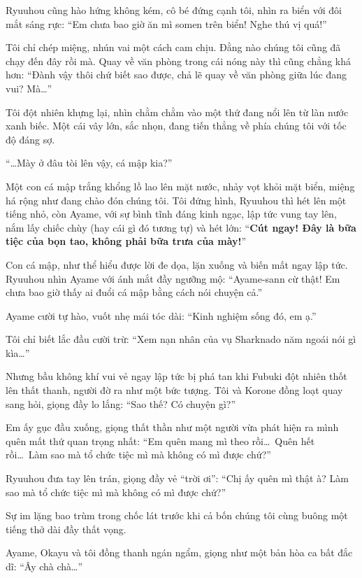 \documentclass[../main.tex]{subfiles}
\begin{document}
Ryuuhou cũng hào hứng không kém, cô bé đứng cạnh tôi, nhìn ra biển với đôi mắt sáng rực: ``Em chưa bao giờ ăn mì somen trên biển! Nghe thú vị quá!''

Tôi chỉ chép miệng, nhún vai một cách cam chịu. Đằng nào chúng tôi cũng đã chạy đến đây rồi mà. Quay về văn phòng trong cái nóng này thì cũng chẳng khá hơn: ``Đành vậy thôi chứ biết sao được, chả lẽ quay về văn phòng giữa lúc đang vui? Mà\dots''

Tôi đột nhiên khựng lại, nhìn chằm chằm vào một thứ đang nổi lên từ làn nước xanh biếc. Một cái vây lớn, sắc nhọn, đang tiến thẳng về phía chúng tôi với tốc độ đáng sợ.

``\dots Mày ở đâu tòi lên vậy, cá mập kia?''

Một con cá mập trắng khổng lồ lao lên mặt nước, nhảy vọt khỏi mặt biển, miệng há rộng như đang chào đón chúng tôi. Tôi đứng hình, Ryuuhou thì hét lên một tiếng nhỏ, còn Ayame, với sự bình tĩnh đáng kinh ngạc, lập tức vung tay lên, nắm lấy chiếc chùy (hay cái gì đó tương tự) và hét lớn: ``\textbf{Cút ngay! Đây là bữa tiệc của bọn tao, không phải bữa trưa của mày!}''

Con cá mập, như thể hiểu được lời đe dọa, lặn xuống và biến mất ngay lập tức. Ryuuhou nhìn Ayame với ánh mắt đầy ngưỡng mộ: ``Ayame-sann cừ thật! Em chưa bao giờ thấy ai đuổi cá mập bằng cách nói chuyện cả.''

Ayame cười tự hào, vuốt nhẹ mái tóc dài: ``Kinh nghiệm sống đó, em ạ.''

Tôi chỉ biết lắc đầu cười trừ: ``Xem nạn nhân của vụ Sharknado năm ngoái nói gì kìa\dots''

Nhưng bầu không khí vui vẻ ngay lập tức bị phá tan khi Fubuki đột nhiên thốt lên thất thanh, người đờ ra như một bức tượng. Tôi và Korone đồng loạt quay sang hỏi, giọng đầy lo lắng: ``Sao thế? Có chuyện gì?''

Em ấy gục đầu xuống, giọng thất thần như một người vừa phát hiện ra mình quên mất thứ quan trọng nhất: ``Em quên mang mì theo rồi\dots\ Quên hết rồi\dots\ Làm sao mà tổ chức tiệc mì mà không có mì được chứ?''

Ryuuhou đưa tay lên trán, giọng đầy vẻ ``trời ơi'': ``Chị ấy quên mì thật à? Làm sao mà tổ chức tiệc mì mà không có mì được chứ?''

Sự im lặng bao trùm trong chốc lát trước khi cả bốn chúng tôi cùng buông một tiếng thở dài đầy thất vọng.

Ayame, Okayu và tôi đồng thanh ngán ngẩm, giọng như một bản hòa ca bất đắc dĩ: ``Ây chà chà\dots''
\end{document}
